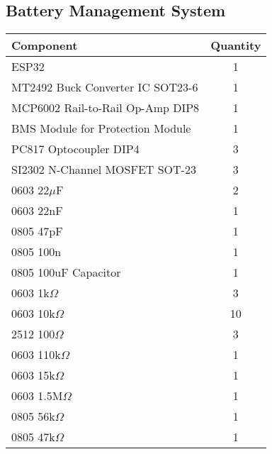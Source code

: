 \subsection{Battery Management System}
\begin{center}
	\setlength\extrarowheight{7pt}
	\begin{tabular}{lc}
		{\large Component} & {\large Quantity} \\\midrule
		{\large ESP32} & {\large 1} \\
		{\large MT2492 Buck Converter IC SOT23-6} & {\large 1} \\
		{\large MCP6002 Rail-to-Rail Op-Amp DIP8} & {\large 1} \\
		{\large BMS Module for Protection Module} & {\large 1} \\
		{\large PC817 Optocoupler DIP4} & {\large 3} \\
		{\large SI2302 N-Channel MOSFET SOT-23} & {\large 3} \\
		{\large 0603 22$\mu$F} & {\large 2} \\
		{\large 0603 22nF} & {\large 1} \\
		{\large 0805 47pF} & {\large 1} \\
		{\large 0805 100n} & {\large 1} \\
		{\large 0805 100uF Capacitor} & {\large 1} \\
		{\large 0603 1k$\Omega$} & {\large 3} \\
		{\large 0603 10k$\Omega$} & {\large 10} \\
		{\large 2512 100$\Omega$} & {\large 3} \\
		{\large 0603 110k$\Omega$} & {\large 1} \\
		{\large 0603 15k$\Omega$} & {\large 1} \\
		{\large 0603 1.5M$\Omega$} & {\large 1} \\
		{\large 0805 56k$\Omega$} & {\large 1} \\
		{\large 0805 47k$\Omega$} & {\large 1} \\
	\end{tabular}
\end{center}


\newpage

